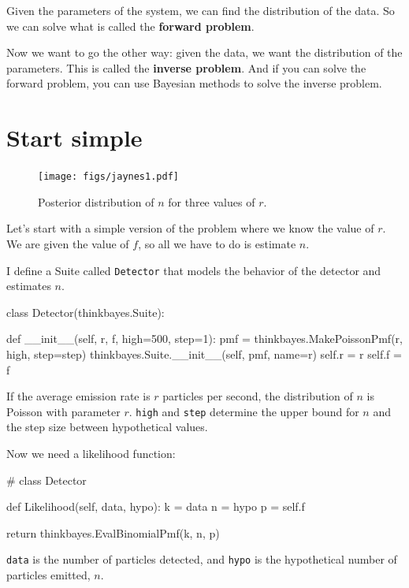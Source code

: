 \documentclass[12pt]{book}
\theoremstyle{exercise}
\newcommand{\py}[1]{{\tt #1}}%
\begin{document}
Given the parameters of the system, we can find the distribution of
the data.  So we can solve what is called the {\bf forward problem}.

Now we want to go the other way: given the data, we
want the distribution of the parameters.  This is called
the {\bf inverse problem}.  And if you can solve the forward
problem, you can use Bayesian methods to solve the inverse problem.


\section{Start simple}

\begin{figure}
\centerline{\texttt{[image: figs/jaynes1.pdf]}}
\caption{Posterior distribution of $n$ for three values of $r$.}
\label{fig.jaynes1}
\end{figure}

Let's start with a simple version of the problem where we know
the value of $r$.  We are given the value of $f$, so all we
have to do is estimate $n$.

I define a Suite called \py{Detector} that models the behavior
of the detector and estimates $n$.

\begin{code}
class Detector(thinkbayes.Suite):

    def __init__(self, r, f, high=500, step=1):
        pmf = thinkbayes.MakePoissonPmf(r, high, step=step)
        thinkbayes.Suite.__init__(self, pmf, name=r)
        self.r = r
        self.f = f
\end{code}

If the average emission rate is $r$ particles per second, the
distribution of $n$ is Poisson with parameter $r$.
\py{high} and \py{step} determine the upper bound for $n$
and the step size between hypothetical values.

Now we need a likelihood function:

\begin{code}
# class Detector

    def Likelihood(self, data, hypo):
        k = data
        n = hypo
        p = self.f

        return thinkbayes.EvalBinomialPmf(k, n, p)
\end{code}

\py{data} is the number of particles detected, and \py{hypo} is
the hypothetical number of particles emitted, $n$.
\end{document}
